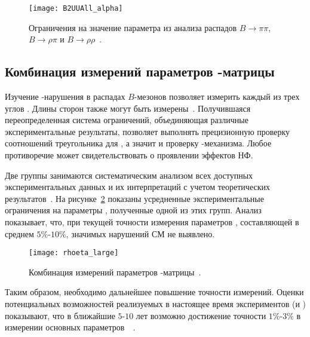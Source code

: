 \begin{figure}[H]
 \centering
  \texttt{[image: B2UUAll\_alpha]}
 \caption{Ограничения на значение параметра \aphi из анализа распадов $B\to\pi\pi$, $B\to\rho\pi$ и $B\to\rho\rho$~\cite{ckmfitter}.}
 \label{fig:alpha}
\end{figure}

\subsection{Комбинация измерений параметров \ckm-матрицы}
Изучение \cpconj-нарушения в распадах $B$-мезонов позволяет измерить каждый из трех углов \ut.  Длины сторон \ut также могут быть измерены~\cite{pdg}.  Получившаяся переопределенная система ограничений, объединяющая различные экспериментальные результаты, позволяет выполнять прецизионную проверку соотношений треугольника для \ut, а значит и проверку \km-механизма.  Любое противоречие может свидетельствовать о проявлении эффектов НФ.


Две группы занимаются систематическим анализом всех доступных экспериментальных данных и их интерпретаций с учетом теоретических результатов~\cite{ckmfitter,utfit}.  На рисунке~\ref{fig:ckmfitter} показаны усредненные экспериментальные ограничения на параметры \ut, полученные одной из этих групп.  Анализ показывает, что, при текущей точности измерения параметров \ut, составляющей в среднем $5\%$-$10\%$, значимых нарушений СМ не выявлено.

\begin{figure}[htb]
 \centering
  \texttt{[image: rhoeta\_large]}
 \caption{Комбинация измерений параметров \ckm-матрицы~\cite{ckmfitter}.}
 \label{fig:ckmfitter}
\end{figure}

Таким образом, необходимо дальнейшее повышение точности измерений.  Оценки потенциальных возможностей реализуемых в настоящее время экспериментов (\lhcb и \belleii) показывают, что в ближайшие $5$-$10$ лет возможно достижение точности $1\%$-$3\%$ в измерении основных параметров~\ut~\cite{Gershon:2016fda}.


